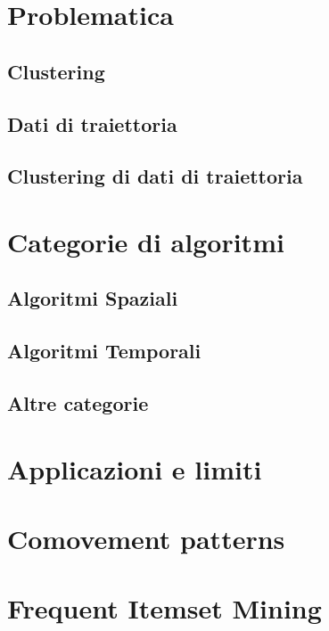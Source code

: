
\section{Problematica}\label{sec:problem}


\subsection{Clustering}\label{subsec:problem:clustering}


\subsection{Dati di traiettoria}\label{subsec:problem:trajectorydata}


\subsection{Clustering di dati di traiettoria}\label{subsec:problem:trajectoryclustering}


\section{Categorie di algoritmi}\label{sec:categories}

\subsection{Algoritmi Spaziali}\label{subsec:categories:spatialalgorithms}

\subsection{Algoritmi Temporali}\label{subsec:categories:temporalalgorithms}

\subsection{Altre categorie}\label{subsec:categories:othersalgorithms}

\section{Applicazioni e limiti}\label{sec:applicationandlimits}

\section{Comovement patterns}\label{sec:comovements-pattern}

\section{Frequent Itemset Mining}\label{sec:frequent-itemset-mining}

